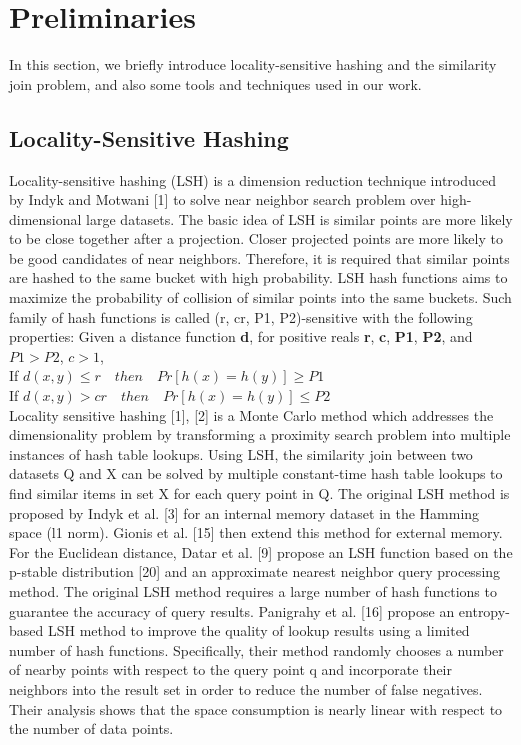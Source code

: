 \documentclass{vldb}
\begin{document}
\section{Preliminaries}
In this section, we briefly introduce locality-sensitive hashing and the similarity join problem, and also some tools and techniques used in our work.

\subsection{Locality-Sensitive Hashing}
Locality-sensitive hashing (LSH) is a dimension reduction technique introduced by Indyk and Motwani [1] to solve near neighbor search problem over high-dimensional large datasets. The basic idea of LSH is similar points are more likely to be close together after a projection. Closer projected points are more likely to be good candidates of near neighbors. Therefore, it is required that similar points are hashed to the same bucket with high probability. LSH hash functions aims to maximize the probability of collision of similar points into the same buckets. Such family of hash functions is called (r, cr, P1, P2)-sensitive with the following properties:
Given a distance function \textbf{d}, for positive reals \textbf{r}, \textbf{c}, \textbf{P1}, \textbf{P2}, and \textbf{$P1 > P2$}, \textbf{$c > 1$},\\
If $d(x, y) \leq r \quad then \quad Pr [h(x) = h(y)] \geq P1$\\
If $d(x, y) > cr \quad then \quad Pr [h(x) = h(y)] \leq P2$\\
Locality sensitive hashing [1], [2] is a Monte Carlo method which addresses the dimensionality problem by transforming a proximity search problem into multiple instances of hash table lookups. Using LSH, the similarity join between two datasets Q and X can be solved by multiple constant-time hash table lookups to find similar items in set X for each query point in Q.
The original LSH method is proposed by Indyk et al. [3] for an internal memory dataset in the Hamming space (l1 norm). Gionis et al. [15] then extend this method for external memory. For the Euclidean distance, Datar et al. [9] propose an LSH function based on the p-stable distribution [20] and an approximate nearest neighbor query processing method.
The original LSH method requires a large number of hash functions to guarantee the accuracy of query results. Panigrahy et al. [16] propose an entropy-based LSH method to improve the quality of lookup results using a limited number of hash functions. Specifically, their method randomly chooses a number of nearby points with respect to the query point q and incorporate their neighbors into the result set in order to reduce the number of false negatives. Their analysis shows that the space consumption is nearly linear with respect to the number of data points.
\end{document}
